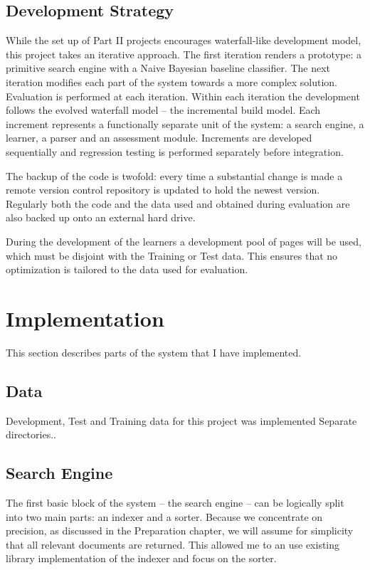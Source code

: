 \documentclass[12pt,twoside,notitlepage]{report}
\begin{document}
\section{Development Strategy}
While the set up of Part II projects encourages waterfall-like development
model, this project takes an iterative approach. The first iteration renders a
prototype: a primitive search engine with a Naive Bayesian baseline classifier.
The next iteration modifies each part of the system towards a more complex
solution. Evaluation is performed at each iteration. Within each  iteration the
development follows the evolved waterfall model -- the incremental build model.
Each increment represents a functionally separate unit of the system: a search
engine, a learner, a parser and an assessment module. Increments are developed
sequentially and regression testing is performed separately before integration.

The backup of the code is twofold: every time a substantial change is made a remote
version control repository is updated to hold the newest version. Regularly both the code and
the data used and obtained during evaluation are also backed up onto an
external hard drive. 

During the development of the learners a development pool of pages will
be used, which must be disjoint with the Training or Test data. This ensures
that no optimization is tailored to the data used for evaluation. 
\cleardoublepage
\chapter{Implementation}
This section describes parts of the system that I have implemented.

\section{Data}
Development, Test and Training data for this project was implemented
Separate directories..

\section{Search Engine}

The first basic block of the system -- the search engine -- can be logically
split into two main parts: an indexer and a sorter. Because we concentrate on
precision, as discussed in the Preparation chapter, we will assume for
simplicity that all relevant documents are returned. This allowed me to an use
existing library implementation of the indexer and focus on the sorter.
\end{document}
